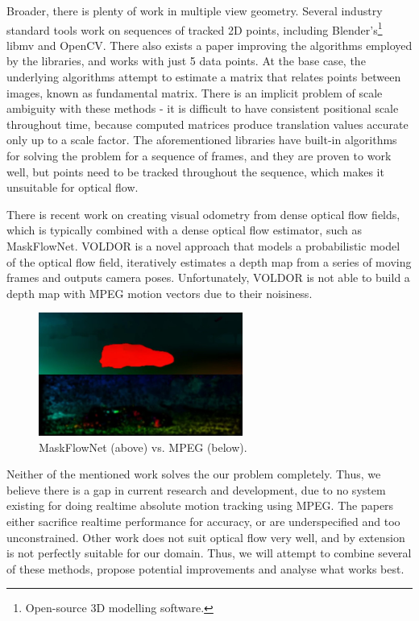 \documentclass[11pt,english]{report}
\begin{document}
Broader, there is plenty of work in multiple view geometry. Several industry standard tools work on sequences of tracked 2D points, including Blender's\footnote{Open-source 3D modelling software.} libmv\cite{libmv} and OpenCV\cite{opencv5calib}. There also exists a paper improving the algorithms employed by the libraries, and works with just 5 data points\cite{1211470}. At the base case, the underlying algorithms attempt to estimate a matrix that relates points between images, known as fundamental matrix. There is an implicit problem of scale ambiguity\cite{hartley_zisserman_2004} with these methods - it is difficult to have consistent positional scale throughout time, because computed matrices produce translation values accurate only up to a scale factor. The aforementioned libraries have built-in algorithms for solving the problem for a sequence of frames, and they are proven to work well, but points need to be tracked throughout the sequence, which makes it unsuitable for optical flow.

There is recent work on creating visual odometry from dense optical flow fields\cite{voldor}, which is typically combined with a dense optical flow estimator, such as MaskFlowNet\cite{zhao2020maskflownet}. VOLDOR\cite{voldor} is a novel approach that models a probabilistic model of the optical flow field, iteratively estimates a depth map from a series of moving frames and outputs camera poses. Unfortunately, VOLDOR is not able to build a depth map with MPEG motion vectors due to their noisiness.

\begin{figure}[!ht]
	\centering
	\includegraphics[width=190pt]{docs/report/mpeg-maskflownet.jpg}
	\caption{\centering MaskFlowNet (above) vs. MPEG (below).}
\end{figure}

Neither of the mentioned work solves the our problem completely. Thus, we believe there is a gap in current research and development, due to no system existing for doing realtime absolute motion tracking using MPEG. The papers either sacrifice realtime performance for accuracy, or are underspecified and too unconstrained. Other work does not suit optical flow very well, and by extension is not perfectly suitable for our domain. Thus, we will attempt to combine several of these methods, propose potential improvements and analyse what works best.
\end{document}
